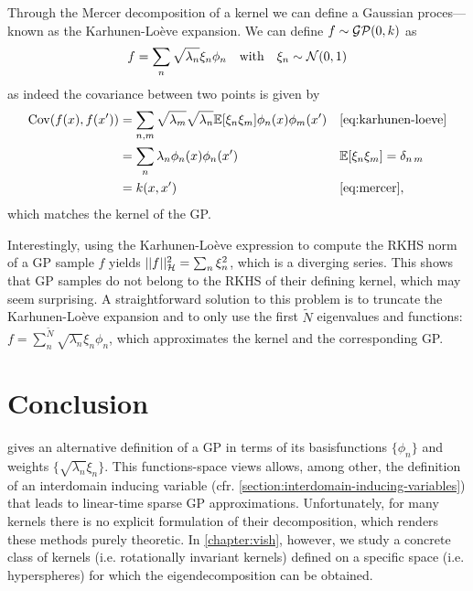 Through the Mercer decomposition of a kernel we can define a Gaussian proces---known as the Karhunen-Lo\`eve expansion. We can define $f \sim \mathcal{GP}(0, k)$ as
\begin{equation}
  \label{eq:karhunen-loeve}
    f = \sum_n \sqrt{\lambda_n} \xi_n \phi_n\quad\text{with}\quad\xi_n \sim \NormDist{0, 1}
\end{equation}
as indeed the covariance between two points is given by
\begin{align}
  \Cov(f(x), f(x')) 
  &= \sum_{n,m} \sqrt{\lambda_m} \sqrt{\lambda_n} \ExpSymb[\xi_n \xi_m] \phi_n(x) \phi_m(x') && \cref{eq:karhunen-loeve}\\
  &= \sum_n \lambda_n \phi_n(x) \phi_n(x')  &&   \ExpSymb[\xi_n \xi_m] = \delta_{n\,m}\\
  &= k(x, x') && \cref{eq:mercer},
\end{align}
which matches the kernel of the GP.

Interestingly, using the  Karhunen-Lo\`eve expression to compute the RKHS norm of a GP sample $f$ yields $\lvert\lvert f\rvert\rvert^2_{{\mathcal{H}}} = \sum_{n} \xi_{n}^2$, which is a diverging series. This shows that GP samples do not belong to the RKHS of their defining kernel, which may seem surprising. A straightforward solution to this problem is to truncate the Karhunen-Lo\`eve expansion and to only use the first $\tilde{N}$ eigenvalues and functions: $f = \sum_n^{\tilde{N}} \sqrt{\lambda_n} \xi_n \phi_n$, which approximates the kernel and the corresponding GP.

\section{Conclusion}
 gives an alternative definition of a GP in terms of its basisfunctions $\{\phi_n\}$ and weights $\{\sqrt{\lambda_n} \xi_n\}$. This functions-space views allows, among other, the definition of an interdomain inducing variable (cfr. \cref{section:interdomain-inducing-variables}) that leads to linear-time sparse GP approximations. Unfortunately, for many kernels there is no explicit formulation of their decomposition, which renders these methods purely theoretic. In \cref{chapter:vish}, however, we study a concrete class of kernels (i.e. rotationally invariant kernels) defined on a specific space (i.e. hyperspheres) for which the eigendecomposition can be obtained.


